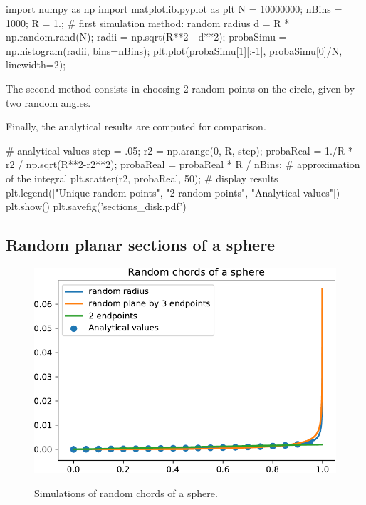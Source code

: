 \begin{python}
import numpy as np
import matplotlib.pyplot as plt
N = 10000000;
nBins = 1000;
R = 1.;
# first simulation method: random radius
d = R * np.random.rand(N);
radii = np.sqrt(R**2 - d**2);
probaSimu = np.histogram(radii, bins=nBins);
plt.plot(probaSimu[1][:-1], probaSimu[0]/N, linewidth=2);
\end{python}

The second method consists in choosing 2 random points on the circle, given by two random angles.

Finally, the analytical results are computed for comparison.
\begin{python}
# analytical values
step = .05;
r2 = np.arange(0, R, step);
probaReal = 1./R * r2 / np.sqrt(R**2-r2**2);
probaReal = probaReal * R / nBins; # approximation of the integral
plt.scatter(r2, probaReal, 50);
# display results
plt.legend(["Unique random points", "2 random points", "Analytical values"])
plt.show()
plt.savefig('sections_disk.pdf')
\end{python}
\vspace*{-8pt}
\subsection{Random planar sections of a sphere}
\vspace*{-8pt}
\begin{figure}[H]
 \centering\caption{Simulations of random chords of a sphere.}%
 \includegraphics[width=.6\textwidth]{sections_sphere-crop.pdf}%
 \label{fig:stereology:python:sphere}%
\end{figure}

